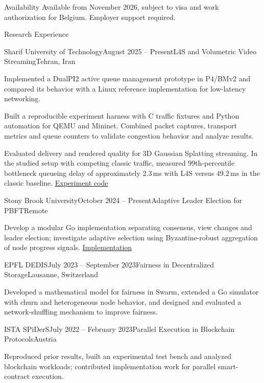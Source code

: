 \documentclass[11pt]{resume}
\begin{document}
\begin{rSection}{Availability}
Available from November 2026, subject to visa and work authorization for Belgium. Employer support required.
\end{rSection}

\newpage
\begin{rSection}{Research Experience}
\begin{rSubsection}{Sharif University of Technology}{August 2025 -- Present}{L4S and Volumetric Video Streaming}{Tehran, Iran}
\item Implemented a DualPI2 active queue management prototype in P4/BMv2 and compared its behavior with a Linux reference implementation for low-latency networking.
\item Built a reproducible experiment harness with C traffic fixtures and Python automation for QEMU and Mininet. Combined packet captures, transport metrics and queue counters to validate congestion behavior and analyze results.
\item Evaluated delivery and rendered quality for 3D Gaussian Splatting streaming. In the studied setup with competing classic traffic, measured 99th-percentile bottleneck queueing delay of approximately 2.3\,ms with L4S versus 49.2\,ms in the classic baseline. \href{https://github.com/Arman17Babaei/imquic-l4s-tests}{Experiment code}
\end{rSubsection}
\begin{rSubsection}{Stony Brook University}{October 2024 -- Present}{Adaptive Leader Election for PBFT}{Remote}
\item Develop a modular Go implementation separating consensus, view changes and leader election; investigate adaptive selection using Byzantine-robust aggregation of node progress signals. \href{https://github.com/Arman17Babaei/pbft}{Implementation}
\end{rSubsection}
\begin{rSubsection}{EPFL DEDIS}{July 2023 -- September 2023}{Fairness in Decentralized Storage}{Lausanne, Switzerland}
\item Developed a mathematical model for fairness in Swarm, extended a Go simulator with churn and heterogeneous node behavior, and designed and evaluated a network-shuffling mechanism to improve fairness.
\end{rSubsection}
\begin{rSubsection}{ISTA SPiDerS}{July 2022 -- February 2023}{Parallel Execution in Blockchain Protocols}{Austria}
\item Reproduced prior results, built an experimental test bench and analyzed blockchain workloads; contributed implementation work for parallel smart-contract execution.
\end{rSubsection}
\end{rSection}
\end{document}
